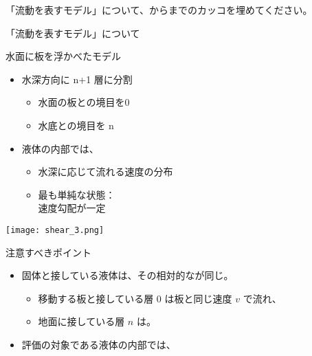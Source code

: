 \documentclass[uplatex,dvipdfmx,a4paper,11pt]{jsarticle}
\begin{document}
\begin{qlist}
	\qitem 「流動を表すモデル」について、からまでのカッコを埋めてください。
		\vspace{5mm}
		\begin{qlist2}
			\qitem 「流動を表すモデル」について
			\begin{center}
				\begin{minipage}{0.4\textwidth}
					\begin{itembox}[l]{水面に板を浮かべたモデル}
						\begin{itemize}
							\item 水深方向に n+1 層に分割
								\begin{itemize}
									\item 水面の板との境目を0
									\item 水底との境目を n 
								\end{itemize}
								\item 液体の内部では、
								\begin{itemize}
									\item 水深に応じて流れる速度の分布
									\item 最も単純な状態：\\速度勾配が一定
								\end{itemize}
						\end{itemize}
					\end{itembox}
				\end{minipage}
				\begin{minipage}{0.45\textwidth}
					\begin{center}
					\texttt{[image: shear\_3.png]}
					\end{center}
				\end{minipage}
				\begin{minipage}{0.9\textwidth}
					\begin{center}
					\begin{itembox}[l]{注意すべきポイント}
						\begin{itemize}
							\item 固体と接している液体は、その相対的な\qbox{}が同じ。
							\begin{itemize}
								\item 移動する板と接している層 0 は板と同じ速度 $v$ で流れ、
								\item 地面に接している層 $n$ は\qbox{}。
							\end{itemize}
							\item 評価の対象である液体の内部では、

\end{itemize}
\end{itembox}
\end{center}
\end{minipage}
\end{center}
\end{qlist2}
\end{qlist}
\end{document}
